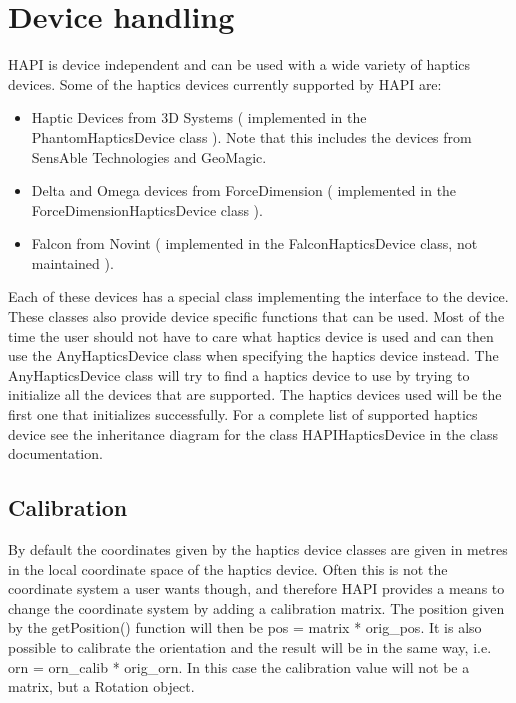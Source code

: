
\chapter {Device handling}
HAPI is device independent and can be used with a wide variety of haptics devices. Some of the haptics devices currently supported by HAPI are:

\begin{itemize}
\item Haptic Devices from 3D Systems \cite{3dsystems} ( implemented in the
  PhantomHapticsDevice class ). Note that this includes the devices from
  SensAble Technologies and GeoMagic.
\item Delta and Omega devices from ForceDimension ( implemented in the
  ForceDimensionHapticsDevice class ). \cite{forcedimension}
\item Falcon from Novint ( implemented in the FalconHapticsDevice class, not maintained ). \cite{novint}
\end{itemize}

Each of these devices has a special class implementing the interface to the device. These classes also provide device specific functions that can be used. Most of the time the user should not have to care what haptics device is used and can then use the AnyHapticsDevice class when specifying the haptics device instead. The AnyHapticsDevice class will try to find a haptics device to use by trying to initialize all the devices that are supported. The haptics devices used will be the first one that initializes successfully.
For a complete list of supported haptics device see the inheritance diagram for the class HAPIHapticsDevice in the class documentation.

\section{Calibration}
By default the coordinates given by the haptics device classes are
given in metres in the local coordinate space of the haptics
device. Often this is not the coordinate system a user wants
though, and therefore HAPI provides a means to change the coordinate
system by adding a calibration matrix. The position given by the
getPosition() function will then be {\ttfamily pos = matrix * orig\_pos}. It is
also possible to calibrate the orientation and the result will be in
the same way, i.e. {\ttfamily orn = orn\_calib * orig\_orn}. In this case the
calibration value will not be a matrix, but a Rotation object.

